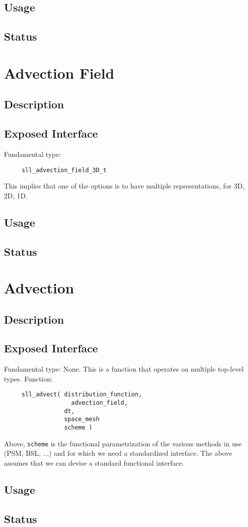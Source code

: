 \documentclass[]{report}   %
\begin{document}
\subsection{Usage}
\subsection{Status}

\section{Advection Field}
\subsection{Description}
\subsection{Exposed Interface}
Fundamental type:
\begin{verbatim}
     sll_advection_field_3D_t
\end{verbatim}
This implies that one of the options is to have multiple representations, for 3D, 2D, 1D. 
\subsection{Usage}
\subsection{Status}

\section{Advection}
\subsection{Description}
\subsection{Exposed Interface}
Fundamental type: None. This is a function that operates on multiple top-level types. Function:
\begin{verbatim}
     sll_advect( distribution_function, 
     	           advection_field, 
                 dt, 
                 space_mesh
                 scheme )
\end{verbatim}
Above, \verb+scheme+ is the functional parametrization of the various methods in use (PSM, BSL, ...) and for which we need a standardized interface. The above assumes that we can devise a standard functional interface.
\subsection{Usage}
\subsection{Status}

\begin{comment}

\begin{thebibliography}{9}
\end{thebibliography}


\end{comment}
\end{document}
